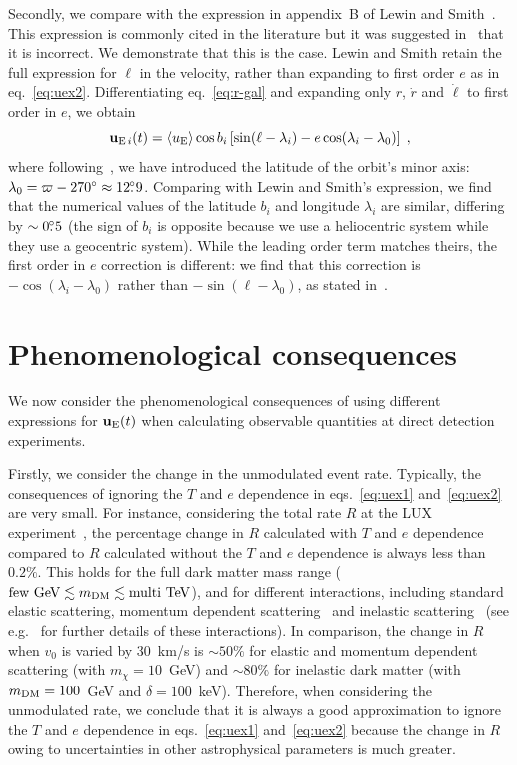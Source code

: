 \documentclass[preprintnumbers,a4paper,twocolumn,floats,nofootinbib,superscriptaddress,aps,prd]{revtex4-1}
\newcommand\fdg{\hbox{$.\!\!^\circ$}}
\begin{document}
Secondly, we compare with the expression in appendix~B of Lewin and Smith~\cite{Lewin:1995rx}. This expression is commonly cited in the literature but it was suggested in~\cite{Lee:2013xxa} that it is incorrect. We demonstrate that this is the case. Lewin and Smith retain the full expression for $\ell$ in the velocity, rather than expanding to first order $e$ as in eq.~\eqref{eq:uex2}. Differentiating eq.~\eqref{eq:r-gal} and expanding only $r$, $\dot{r}$ and $\dot{\ell}$ to first order in $e$, we obtain
\begin{equation}
\mathbf{u}_{\mathrm{E}\,i}(t)=\langle u_{\rm{E}}\rangle\cos b_i\left[ \sin(\ell-\lambda_i)-e\cos(\lambda_i-\lambda_0)\right]\;,
\end{equation}
where following~\cite{Lewin:1995rx}, we have introduced the latitude of the orbit's minor axis: $\lambda_0=\varpi-270\degree\approx12\fdg9$. Comparing with Lewin and Smith's expression, we find that the numerical values of the latitude $b_i$ and longitude $\lambda_i$ are similar, differing by $\sim 0\fdg5$ (the sign of $b_i$ is opposite because we use a heliocentric system while they use a geocentric system). While the leading order term matches theirs, the first order in $e$ correction is different: we find that this correction is $-\cos(\lambda_i-\lambda_0)$ rather than $-\sin(\ell-\lambda_0)$, as stated in~\cite{Lewin:1995rx}.

\section{Phenomenological consequences}
\label{section:phenomenology}

We now consider the phenomenological consequences of using different expressions for $\mathbf{u}_{\rm{E}}(t)$ when calculating observable quantities at direct detection experiments. 

Firstly, we consider the change in the unmodulated event rate. Typically, the consequences of ignoring the $T$ and $e$ dependence in eqs.~\eqref{eq:uex1} and~\eqref{eq:uex2} are very small. For instance, considering the total rate $R$ at the LUX experiment~\cite{Akerib:2013tjd}, the percentage change in $R$ calculated with  $T$ and $e$ dependence compared to $R$ calculated without the $T$ and $e$ dependence is always less than $0.2\%$. This holds for the full dark matter mass range ($\text{few GeV}\lesssim m_{\rm{DM}} \lesssim \text{multi TeV}$), and for different interactions, including standard elastic scattering, momentum dependent scattering~\cite{Chang:2009yt} and inelastic scattering~\cite{TuckerSmith:2001hy} (see e.g.~\cite{Frandsen:2013cna} for further details of these interactions). In comparison, the change in $R$ when $v_0$ is varied by 30~km/s is $\sim50\%$ for elastic and momentum dependent scattering (with $m_{\chi}=10$~GeV) and $\sim80\%$ for inelastic dark matter (with $m_{\rm{DM}}=100$~GeV and $\delta=100$~keV). Therefore, when considering the unmodulated rate, we conclude that it is always a good approximation to ignore the $T$ and $e$ dependence in eqs.~\eqref{eq:uex1} and~\eqref{eq:uex2} because the change in $R$ owing to uncertainties in other astrophysical parameters is much greater. 
\end{document}
